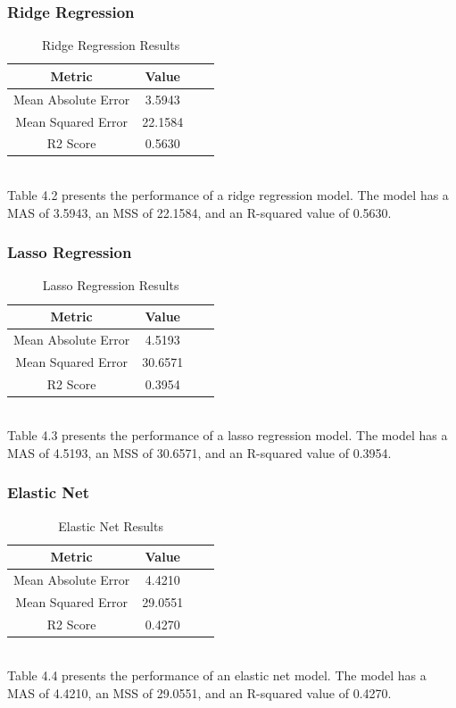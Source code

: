 \documentclass{report}
\begin{document}
\subsubsection{Ridge Regression}
\begin{table}[h]
\centering
\begin{tabular}{|c|c|c|c|}
\hline
\textbf{Metric} & \textbf{Value} \\ \hline
Mean Absolute Error & 3.5943 \\ \hline
Mean Squared Error & 22.1584 \\ \hline
R2 Score & 0.5630 \\ \hline
\end{tabular}
\caption{Ridge Regression Results}
\end{table}
\hfill \break
\\
Table 4.2 presents the performance of a ridge regression model. The model has a MAS of 3.5943, an MSS of 22.1584, and an R-squared value of 0.5630.
\subsubsection{Lasso Regression}
\begin{table}[h]
\centering
\begin{tabular}{|c|c|c|c|}
\hline
\textbf{Metric} & \textbf{Value} \\ \hline
Mean Absolute Error & 4.5193 \\ \hline
Mean Squared Error & 30.6571 \\ \hline
R2 Score & 0.3954 \\ \hline
\end{tabular}
\caption{Lasso Regression Results}
\end{table}
\hfill \break
\\
Table 4.3 presents the performance of a lasso regression model. The model has a MAS of 4.5193, an MSS of 30.6571, and an R-squared value of 0.3954.
\subsubsection{Elastic Net}
\begin{table}[h]
\centering
\begin{tabular}{|c|c|c|c|}
\hline
\textbf{Metric} & \textbf{Value} \\ \hline
Mean Absolute Error & 4.4210 \\ \hline
Mean Squared Error & 29.0551 \\ \hline
R2 Score & 0.4270 \\ \hline
\end{tabular}
\caption{Elastic Net Results}
\end{table}
\hfill \break
\\
Table 4.4 presents the performance of an elastic net model. The model has a MAS of 4.4210, an MSS of 29.0551, and an R-squared value of 0.4270.
\end{document}
